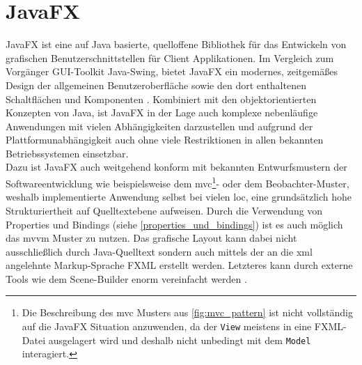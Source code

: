 \section{JavaFX}
\label{javafx}
\noindent JavaFX ist eine auf Java basierte, quelloffene Bibliothek für das Entwickeln von grafischen Benutzerschnittstellen für Client Applikationen. Im Vergleich zum Vorgänger GUI-Toolkit Java-Swing, bietet JavaFX ein modernes, zeitgemäßes Design der allgemeinen Benutzeroberfläche sowie den dort enthaltenen Schaltflächen und Komponenten \cite{Sharan2015}. Kombiniert mit den objektorientierten Konzepten von Java, ist JavaFX in der Lage auch komplexe nebenläufige Anwendungen mit vielen Abhängigkeiten darzustellen und aufgrund der Plattformunabhängigkeit auch ohne viele Restriktionen in allen bekannten Betriebssystemen einsetzbar.\\
Dazu ist JavaFX auch weitgehend konform mit bekannten Entwurfsmustern der Softwareentwicklung wie beispielsweise dem \ac{mvc}\footnote{Die Beschreibung des \ac{mvc} Musters aus \autoref{fig:mvc_pattern} ist nicht vollständig auf die JavaFX Situation anzuwenden, da der  \texttt{View} meistens in eine FXML-Datei ausgelagert wird und deshalb nicht unbedingt mit dem \texttt{Model} interagiert.}- oder dem Beobachter-Muster, weshalb implementierte Anwendung selbst bei vielen \ac{loc}, eine grundsätzlich hohe Strukturiertheit auf Quelltextebene aufweisen. Durch die Verwendung von Properties und Bindings (siehe \autoref{properties_und_bindings}) ist es auch möglich das \ac{mvvm} Muster zu nutzen. Das grafische Layout kann dabei nicht ausschließlich durch Java-Quelltext sondern auch mittels der an die \ac{xml} angelehnte Markup-Sprache FXML erstellt werden. Letzteres kann durch externe Tools wie dem Scene-Builder enorm vereinfacht werden \cite{Vos2018}.


